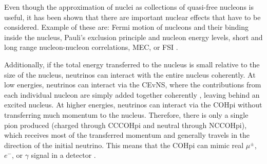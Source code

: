 

Even though the approximation of nuclei as collections of quasi-free nucleons is useful, it has been shown \cite{MiniBooNE2p2hExperimentalDiscrepancy2010.pdf} that there are important nuclear effects that have to be considered. Example of these are: Fermi motion of nucleons and their binding inside the nucleus,  Pauli's exclusion principle and nucleon energy levels, short and long range nucleon-nucleon correlations, \gls{MEC}, or \gls{FSI} \cite{NeutrinoIntOverview2022.pdf}.

Additionally, if the total energy transferred to the nucleus is small relative to the size of the nucleus, neutrinos can interact with the entire nucleus coherently. At low energies, neutrinos can interact via the \gls{CEvNS}, where the contributions from each individual nucleon are simply added together coherently \cite{CEvENSFirstObservation2017.pdf}, leaving behind an excited nucleus. At higher energies, neutrinos can interact via the \gls{COHpi} without transferring much momentum to the nucleus. Therefore, there is only a single pion produced (charged through \gls{CC}\gls{COHpi} and neutral through \gls{NC}\gls{COHpi}), which receives most of the transferred momentum and generally travels in the direction of the initial neutrino. This means that the \gls{COHpi} can mimic real $\mu^\pm$, $e^-$, or $\gamma$ signal in a detector \cite{NeutrinoIntOverview2022.pdf}.


